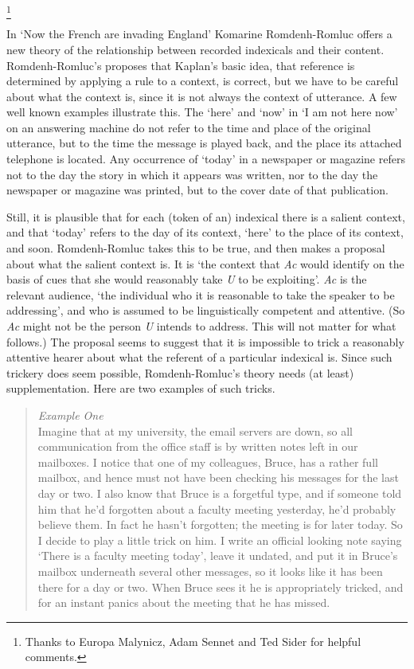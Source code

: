 \footnote{Thanks to Europa Malynicz, Adam Sennet and Ted Sider for helpful comments.}

In `Now the French are invading England' Komarine Romdenh-Romluc \citeyearpar{KRR2002} offers a new theory of the relationship between recorded indexicals and their content. Romdenh-Romluc's proposes that Kaplan's basic idea, that reference is determined by applying a rule to a context, is correct, but we have to be careful about what the context is, since it is not always the context of utterance. A few well known examples illustrate this. The `here' and `now' in `I am not here now' on an answering machine do not refer to the time and place of the original utterance, but to the time the message is played back, and the place its attached telephone is located. Any occurrence of `today' in a newspaper or magazine refers not to the day the story in which it appears was written, nor to the day the newspaper or magazine was printed, but to the cover date of that publication.

Still, it is plausible that for each (token of an) indexical there is a salient context, and that `today' refers to the day of its context, `here' to the place of its context, and soon. Romdenh-Romluc takes this to be true, and then makes a proposal about what the salient context is. It is `the context that \textit{Ac} would identify on the basis of cues that she would reasonably take \textit{U} to be exploiting'. \citeyear[39]{KRR2002} \textit{Ac} is the relevant audience, `the individual who it is reasonable to take the speaker to be addressing', and who is assumed to be linguistically competent and attentive. (So \textit{Ac} might not be the person \textit{U} intends to address. This will not matter for what follows.) The proposal seems to suggest that it is impossible to trick a reasonably attentive hearer about what the referent of a particular indexical is. Since such trickery does seem possible, Romdenh-Romluc's theory needs (at least) supplementation. Here are two examples of such tricks.

\begin{quote}

{\itshape Example One} \\
Imagine that at my university, the email servers are down, so all communication from the office staff is by written notes left in our mailboxes. I notice that one of my colleagues, Bruce, has a rather full mailbox, and hence must not have been checking his messages for the last day or two. I also know that Bruce is a forgetful type, and if someone told him that he'd forgotten about a faculty meeting yesterday, he'd probably believe them. In fact he hasn't forgotten; the meeting is for later today. So I decide to play a little trick on him. I write an official looking note saying `There is a faculty meeting today', leave it undated, and put it in Bruce's mailbox underneath several other messages, so it looks like it has been there for a day or two. When Bruce sees it he is appropriately tricked, and for an instant panics about the meeting that he has missed.
\end{quote}

